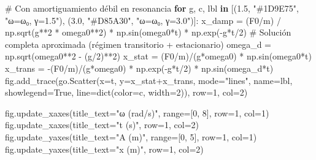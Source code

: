 \documentclass[
  letterpaper,
  DIV=11,
  numbers=noendperiod]{scrreprt}
\newenvironment{Shaded}{\begin{snugshade}}{\end{snugshade}}
\newcommand{\BuiltInTok}[1]{\textcolor[rgb]{0.00,0.23,0.31}{#1}}
\newcommand{\CommentTok}[1]{\textcolor[rgb]{0.37,0.37,0.37}{#1}}
\newcommand{\ControlFlowTok}[1]{\textcolor[rgb]{0.00,0.23,0.31}{\textbf{#1}}}
\newcommand{\DecValTok}[1]{\textcolor[rgb]{0.68,0.00,0.00}{#1}}
\newcommand{\FloatTok}[1]{\textcolor[rgb]{0.68,0.00,0.00}{#1}}
\newcommand{\KeywordTok}[1]{\textcolor[rgb]{0.00,0.23,0.31}{\textbf{#1}}}
\newcommand{\NormalTok}[1]{\textcolor[rgb]{0.00,0.23,0.31}{#1}}
\newcommand{\OperatorTok}[1]{\textcolor[rgb]{0.37,0.37,0.37}{#1}}
\newcommand{\StringTok}[1]{\textcolor[rgb]{0.13,0.47,0.30}{#1}}
\newcommand{\VariableTok}[1]{\textcolor[rgb]{0.07,0.07,0.07}{#1}}
\begin{document}
\begin{Shaded}
\begin{Highlighting}[]
\CommentTok{\# Con amortiguamiento débil en resonancia}
\ControlFlowTok{for}\NormalTok{ g, c, lbl }\KeywordTok{in}\NormalTok{ [(}\FloatTok{1.5}\NormalTok{, }\StringTok{"\#1D9E75"}\NormalTok{, }\StringTok{"ω=ω₀, γ=1.5"}\NormalTok{), (}\FloatTok{3.0}\NormalTok{, }\StringTok{"\#D85A30"}\NormalTok{, }\StringTok{"ω=ω₀, γ=3.0"}\NormalTok{)]:}
\NormalTok{    x\_damp }\OperatorTok{=}\NormalTok{ (F0}\OperatorTok{/}\NormalTok{m) }\OperatorTok{/}\NormalTok{ np.sqrt(g}\OperatorTok{**}\DecValTok{2} \OperatorTok{*}\NormalTok{ omega0}\OperatorTok{**}\DecValTok{2}\NormalTok{) }\OperatorTok{*}\NormalTok{ np.sin(omega0}\OperatorTok{*}\NormalTok{t) }\OperatorTok{*}\NormalTok{ np.exp(}\OperatorTok{{-}}\NormalTok{g}\OperatorTok{*}\NormalTok{t}\OperatorTok{/}\DecValTok{2}\NormalTok{)}
    \CommentTok{\# Solución completa aproximada (régimen transitorio + estacionario)}
\NormalTok{    omega\_d }\OperatorTok{=}\NormalTok{ np.sqrt(omega0}\OperatorTok{**}\DecValTok{2} \OperatorTok{{-}}\NormalTok{ (g}\OperatorTok{/}\DecValTok{2}\NormalTok{)}\OperatorTok{**}\DecValTok{2}\NormalTok{)}
\NormalTok{    x\_stat  }\OperatorTok{=}\NormalTok{ (F0}\OperatorTok{/}\NormalTok{m)}\OperatorTok{/}\NormalTok{(g}\OperatorTok{*}\NormalTok{omega0) }\OperatorTok{*}\NormalTok{ np.sin(omega0}\OperatorTok{*}\NormalTok{t)}
\NormalTok{    x\_trans }\OperatorTok{=} \OperatorTok{{-}}\NormalTok{(F0}\OperatorTok{/}\NormalTok{m)}\OperatorTok{/}\NormalTok{(g}\OperatorTok{*}\NormalTok{omega0) }\OperatorTok{*}\NormalTok{ np.exp(}\OperatorTok{{-}}\NormalTok{g}\OperatorTok{*}\NormalTok{t}\OperatorTok{/}\DecValTok{2}\NormalTok{) }\OperatorTok{*}\NormalTok{ np.sin(omega\_d}\OperatorTok{*}\NormalTok{t)}
\NormalTok{    fig.add\_trace(go.Scatter(x}\OperatorTok{=}\NormalTok{t, y}\OperatorTok{=}\NormalTok{x\_stat}\OperatorTok{+}\NormalTok{x\_trans, mode}\OperatorTok{=}\StringTok{"lines"}\NormalTok{,}
\NormalTok{        name}\OperatorTok{=}\NormalTok{lbl, showlegend}\OperatorTok{=}\VariableTok{True}\NormalTok{,}
\NormalTok{        line}\OperatorTok{=}\BuiltInTok{dict}\NormalTok{(color}\OperatorTok{=}\NormalTok{c, width}\OperatorTok{=}\DecValTok{2}\NormalTok{)), row}\OperatorTok{=}\DecValTok{1}\NormalTok{, col}\OperatorTok{=}\DecValTok{2}\NormalTok{)}

\NormalTok{fig.update\_xaxes(title\_text}\OperatorTok{=}\StringTok{"ω (rad/s)"}\NormalTok{, }\BuiltInTok{range}\OperatorTok{=}\NormalTok{[}\DecValTok{0}\NormalTok{, }\DecValTok{8}\NormalTok{],   row}\OperatorTok{=}\DecValTok{1}\NormalTok{, col}\OperatorTok{=}\DecValTok{1}\NormalTok{)}
\NormalTok{fig.update\_xaxes(title\_text}\OperatorTok{=}\StringTok{"t (s)"}\NormalTok{,                      row}\OperatorTok{=}\DecValTok{1}\NormalTok{, col}\OperatorTok{=}\DecValTok{2}\NormalTok{)}
\NormalTok{fig.update\_yaxes(title\_text}\OperatorTok{=}\StringTok{"A (m)"}\NormalTok{,     }\BuiltInTok{range}\OperatorTok{=}\NormalTok{[}\DecValTok{0}\NormalTok{, }\DecValTok{5}\NormalTok{],    row}\OperatorTok{=}\DecValTok{1}\NormalTok{, col}\OperatorTok{=}\DecValTok{1}\NormalTok{)}
\NormalTok{fig.update\_yaxes(title\_text}\OperatorTok{=}\StringTok{"x (m)"}\NormalTok{,                      row}\OperatorTok{=}\DecValTok{1}\NormalTok{, col}\OperatorTok{=}\DecValTok{2}\NormalTok{)}


\end{Highlighting}
\end{Shaded}
\end{document}

